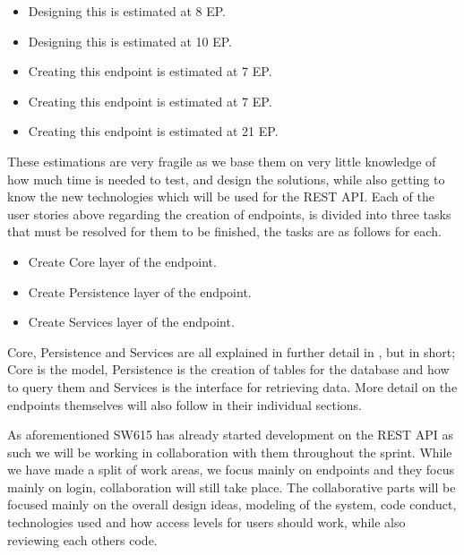 \begin{itemize}[style=unboxed]
	\item {} 
	Designing this is estimated at 8 EP.
	\item {}
	Designing this is estimated at 10 EP.
	\item {}
	Creating this endpoint is estimated at 7 EP.
	\item {}
	Creating this endpoint is estimated at 7 EP.
	\item {}
	Creating this endpoint is estimated at 21 EP.
\end{itemize}
These estimations are very fragile as we base them on very little knowledge of how much time is needed to test, and design the solutions, while also getting to know the new technologies which will be used for the REST API.
Each of the user stories above regarding the creation of endpoints, is divided into three tasks that must be resolved for them to be finished, the tasks are as follows for each.
\begin{itemize}
    \item Create Core layer of the endpoint.
    \item Create Persistence layer of the endpoint.
    \item Create Services layer of the endpoint.
\end{itemize}
Core, Persistence and Services are all explained in further detail in \myref{}, but in short; Core is the model, Persistence is the creation of tables for the database and how to query them and Services is the interface for retrieving data.
More detail on the endpoints themselves will also follow in their individual sections.

As aforementioned SW615 has already started development on the REST API as such we will be working in collaboration with them throughout the sprint.
While we have made a split of work areas, we focus mainly on endpoints and they focus mainly on login, collaboration will still take place.
The collaborative parts will be focused mainly on the overall design ideas, modeling of the system, code conduct, technologies used and how access levels for users should work, while also reviewing each others code.

